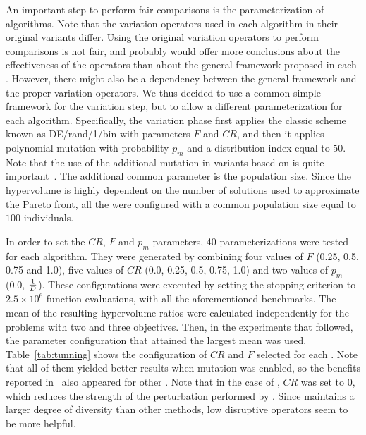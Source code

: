 %
%
%
%
%

An important step to perform fair comparisons is the parameterization of algorithms.
%
Note that the variation operators used in each algorithm in their original variants differ.
%
Using the original variation operators to perform comparisons is not fair, and probably would offer more conclusions 
about the effectiveness of the operators than about the general framework proposed in each \MOEA{}.
%
However, there might also be a dependency between the general framework and the proper variation operators.
%
We thus decided to use a common simple framework for the variation step, but to allow a different parameterization
for each algorithm.
%
Specifically, the variation phase first applies the classic \DE{} scheme known as DE/rand/1/bin with parameters $F$
and $CR$, and then it applies polynomial mutation with probability $p_m$
and a distribution index equal to $50$.
%
Note that the use of the additional mutation in variants based on \MOEAD{} is quite important~\cite{zhang2009performance}.
%
The additional common parameter is the population size.
%
Since the hypervolume is highly dependent on the number of solutions used to approximate the Pareto front,
all the \MOEAS{} were configured with a common population size equal to $100$ individuals.

In order to set the $CR$, $F$ and $p_m$ parameters, 40 parameterizations were tested for each algorithm.
%
They were generated by combining four values of $F$ (0.25, 0.5, 0.75 and 1.0), five values of $CR$ (0.0, 0.25, 0.5, 0.75, 1.0) 
and two values of $p_m$ (0.0, $1\over{D}$).
%
These configurations were executed by setting the stopping criterion to $2.5 \times 10^{6}$ function evaluations, 
with all the aforementioned benchmarks.
%
The mean of the resulting hypervolume ratios were calculated independently for the problems with two and three objectives.
%
Then, in the experiments that followed, the parameter configuration that attained the largest mean was used.
%
Table~\ref{tab:tunning} shows the configuration of $CR$ and $F$ selected for each \MOEA{}.
%
Note that all of them yielded better results when mutation was enabled, so the benefits reported in~\cite{zhang2009performance}
also appeared for other \MOEAS{}.
%
Note that in the case of \AVSDMOEAD{}, $CR$ was set to 0, which reduces the strength of the perturbation performed
by \DE{}.
%
Since \AVSDMOEAD{} maintains a larger degree of diversity than other methods, low disruptive
operators seem to be more helpful.

